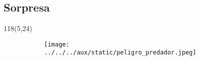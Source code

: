 \documentclass[shownotes]{beamer}
\begin{document}
\subsection{Sorpresa}
\begin{frame}



\begin{textblock}{118}(5,24)
  \begin{figure}[H]     
     \centering \normalsize
     \begin{subfigure}[b]{0.9\textwidth}
       \texttt{[image: ../../../aux/static/peligro\_predador.jpeg]} 
     \end{subfigure}
\end{figure}
\end{textblock}
 
 
 
\end{frame}
\end{document}
